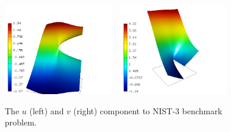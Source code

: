 \documentclass[12pt]{elsarticle}
\begin{document}
\begin{figure}[!ht]
\centering
\includegraphics[height=40mm]{nist/nist-3/solution-u.png}\ \
\includegraphics[height=40mm]{nist/nist-3/solution-v.png}
\caption{The $u$ (left) and $v$ (right) component to NIST-3 benchmark problem.}
\label{fig:sln-nist03}
\end{figure}
\end{document}
